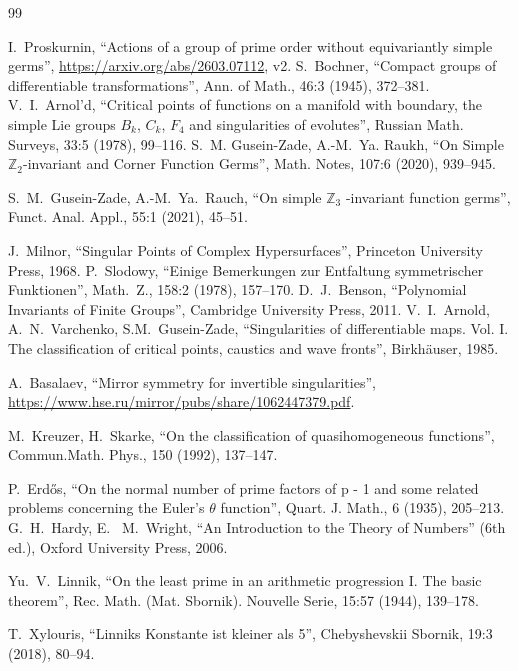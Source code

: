 \documentclass{amsart}
\begin{document}
\begin{thebibliography}{99}

I.~Proskurnin, ``Actions of a group of prime order without equivariantly simple germs'', \url{https://arxiv.org/abs/2603.07112}, v2.
 S.~Bochner, ``Compact groups of differentiable transformations'', Ann. of Math., 46:3 (1945), 372--381.
V.~I.~Arnol'd, ``Critical points of functions on a manifold with boundary, the simple Lie groups $B_k$, $C_k$, $F_4$ and singularities of evolutes'', Russian Math. Surveys, 33:5 (1978), 99--116.
 S.~M. Gusein-Zade, A.-M.~Ya. Raukh, ``On Simple $\mathbb{Z}_2$-invariant and Corner Function Germs'', Math. Notes, 107:6 (2020), 939--945.

S.~M.~Gusein-Zade, A.-M.~Ya.~Rauch, ``On simple $\mathbb{Z}_3$
-invariant function germs'', Funct. Anal. Appl., 55:1 (2021), 45--51.

J.~Milnor, ``Singular Points of Complex Hypersurfaces'', Princeton University Press, 1968.
P.~Slodowy, ``Einige Bemerkungen zur Entfaltung symmetrischer Funktionen'', Math.~Z., 158:2 (1978), 157--170.
 D.~J.~Benson, ``Polynomial Invariants of Finite Groups'', Cambridge University Press, 2011.
V.~I.~Arnold, A.~N.~Varchenko, S.M.~Gusein-Zade,  ``Singularities of differentiable maps. Vol. I. The classification of critical points, caustics and wave fronts'', Birkh\"{a}user, 1985.

A.~Basalaev, ``Mirror symmetry for invertible singularities'', \url{https://www.hse.ru/mirror/pubs/share/1062447379.pdf}.

 M.~Kreuzer, H.~Skarke, ``On the classification of quasihomogeneous functions'', Commun.Math. Phys., 150 (1992), 137--147.

P.~Erd\H{o}s, ``On the normal number of prime factors of p - 1 and some related problems concerning the Euler's $\theta$ function'', Quart. J. Math., 6 (1935), 205--213.
 G.~H.~Hardy, E.~ M.~Wright, ``An Introduction to the Theory of Numbers'' (6th ed.), Oxford University Press, 2006.


 Yu.~V.~Linnik,  ``On the least prime in an arithmetic progression I. The basic theorem'', Rec. Math. (Mat. Sbornik). Nouvelle Serie, 15:57 (1944), 139--178. 

T.~Xylouris, ``Linniks Konstante ist kleiner als 5'', Chebyshevskii Sbornik, 19:3 (2018), 80--94.
\end{thebibliography}
\end{document}
